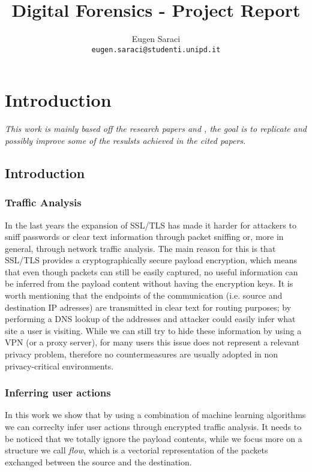 \documentclass[a4paper,10pt]{report}
\title{Digital Forensics - Project Report}
\author{Eugen Saraci\\ \small{\texttt{eugen.saraci@studenti.unipd.it}}}
\begin{document}
\maketitle

\chapter{Introduction}
\label{ch:intro}
\noindent\textit{This work is mainly based off the research papers \cite{contiknocking} and \cite{contianalysis}, the goal is to replicate and possibly improve some of the resulsts achieved  in the cited papers.}
\section{Introduction}



\subsection{Traffic Analysis}
In the last years the expansion of SSL/TLS has made it harder for attackers to sniff passwords or clear text information through packet sniffing or, more in general, through network traffic analysis. The main reason for this is that SSL/TLS provides a cryptographically secure payload encryption, which means that even though packets can still be easily captured, no useful information can be inferred from the payload content without having the encryption keys. It is worth mentioning that the endpoints of the communication (i.e. source and destination IP adresses) are transmitted in clear text for routing purposes; by performing a DNS lookup of the addresses and attacker could easily infer what site a user is visiting. While we can still try to hide these information by using a VPN (or a proxy server), for many users this issue does not represent a relevant privacy problem, therefore no countermeasures are usually adopted in non privacy-critical environments.

\subsection{Inferring user actions}
In this work we show that by using a combination of machine learning algorithms we can correclty infer user actions through encrypted traffic analysis. It needs to be noticed that we totally ignore the payload contents, while we focus more on a structure we call \textit{flow}, which is a vectorial representation of the packets exchanged between the source and the destination. 
\end{document}
